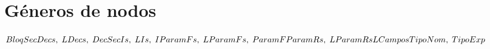 \section{Géneros de nodos}

\begin{math}
    Bloq \\
    SecDecs, \; LDecs, \; Dec \\
    SecIs, \; LIs, \; I \\
    ParamFs, \; LParamFs, \; ParamF \\
    ParamRs, \; LParamRs \\
    LCampos \\
    TipoNom, \; Tipo \\
    Exp
\end{math}